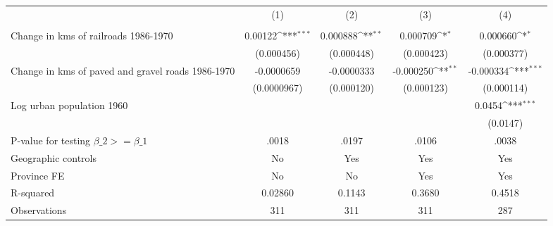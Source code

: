 {
\def\sym#1{\ifmmode^{#1}\else\(^{#1}\)\fi}
\begin{tabular}{l*{4}{c}}
\hline\hline
                &\multicolumn{1}{c}{(1)}&\multicolumn{1}{c}{(2)}&\multicolumn{1}{c}{(3)}&\multicolumn{1}{c}{(4)}\\
                &\multicolumn{1}{c}{}&\multicolumn{1}{c}{}&\multicolumn{1}{c}{}&\multicolumn{1}{c}{}\\
\hline
Change in kms of railroads 1986-1970&  0.00122\sym{***}& 0.000888\sym{**} & 0.000709\sym{*}  & 0.000660\sym{*}  \\
                &(0.000456)         &(0.000448)         &(0.000423)         &(0.000377)         \\
[1em]
Change in kms of paved and gravel roads 1986-1970&-0.0000659         &-0.0000333         &-0.000250\sym{**} &-0.000334\sym{***}\\
                &(0.0000967)         &(0.000120)         &(0.000123)         &(0.000114)         \\
[1em]
Log urban population 1960&                  &                  &                  &   0.0454\sym{***}\\
                &                  &                  &                  & (0.0147)         \\
\hline
P-value for testing $\beta\_{2} >= \beta\_{1}$&    .0018         &    .0197         &    .0106         &    .0038         \\
Geographic controls&       No         &      Yes         &      Yes         &      Yes         \\
Province FE     &       No         &       No         &      Yes         &      Yes         \\
R-squared       &  0.02860         &   0.1143         &   0.3680         &   0.4518         \\
Observations    &      311         &      311         &      311         &      287         \\
\hline\hline
\end{tabular}
}
